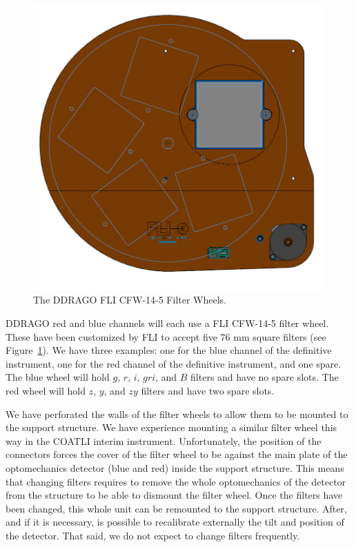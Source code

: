 \documentclass{report}
\begin{document}
\begin{figure}[p]
\begin{center}
\includegraphics[width=\linewidth]{figures/filter-wheel.png}
\end{center}
\caption{The DDRAGO FLI CFW-14-5 Filter Wheels.}
\label{figure:alex-ddrago-cfw}
\end{figure}

DDRAGO red and blue channels will each use a FLI CFW-14-5 filter wheel. These have been customized by FLI to accept five 76 mm square filters (see Figure~\ref{figure:alex-ddrago-cfw}). We have three examples: one for the blue channel of the definitive instrument, one for the red channel of the definitive instrument, and one spare. The blue wheel will hold $g$, $r$, $i$, $gri$, and $B$ filters and have no spare slots. The red wheel will hold $z$, $y$, and $zy$ filters and have two spare slots.

We have perforated the walls of the filter wheels to allow them to be mounted to the support structure. We have experience mounting a similar filter wheel this way in the COATLI interim instrument. Unfortunately, the position of the connectors forces the cover of the filter wheel to be against the main plate of the optomechanics detector (blue and red) inside the support structure. This means that changing filters requires to remove the whole optomechanics of the detector from the structure to be able to dismount the filter wheel. Once the filters have been changed, this whole unit can be remounted to the support structure. After, and if it is necessary, is possible to recalibrate externally the tilt and position of the detector. That said, we do not expect to change filters frequently.
\end{document}
